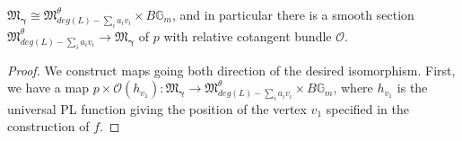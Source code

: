 \documentclass[10pt,a4paper]{amsart}
\begin{document}
\begin{proposition}\label{smooth}
$\mathfrak{M}_{\pmb\gamma}\cong\mathfrak{M}^\theta_{deg(L) -\sum_i a_iv_i} \times B\mathbb{G}_m$, and in particular there is a smooth section $\mathfrak{M}^\theta_{deg(L) -\sum_i a_iv_i} \rightarrow \mathfrak{M}_{\pmb\gamma} $ of $p$ with relative cotangent bundle $\mathcal{O}$. 
\end{proposition}

\begin{proof}
%
%
%
%
%
%
%

We construct maps going both direction of the desired isomorphism. First, we have a map $p \times \mathcal{O}(h_{v_1}): \mathfrak{M}_{\pmb\gamma}\rightarrow \mathfrak{M}^\theta_{deg(L) -\sum_i a_iv_i} \times B\mathbb{G}_m$, where $h_{v_1}$ is the universal PL function giving the position of the vertex $v_1$ specified in the construction of $f$.


\end{proof}
\end{document}
